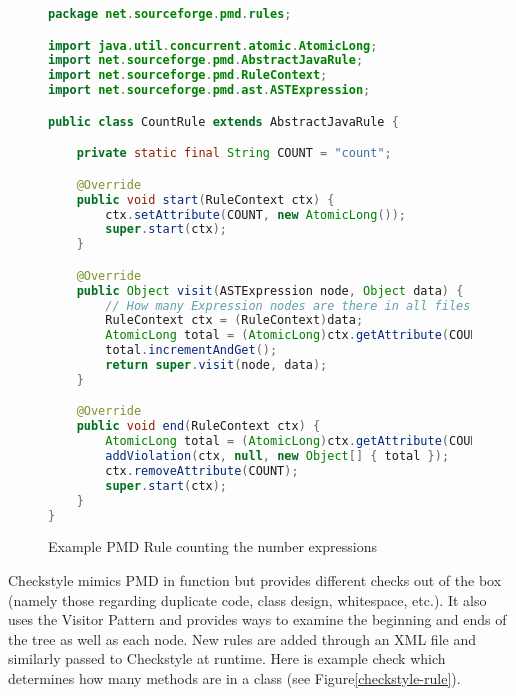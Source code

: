 \documentclass[12pt]{report}
\newcommand{\todoin}{\todo[inline]}
\def\lstlistingname{Figure}
\newcommand{\refCode}{\lstlistingname \hspace{1mm}}
\begin{document}
\begin{figure}
\caption[Example PMD Rule]{Example PMD Rule counting the number expressions}
\label{pmd-rule}
\begin{lstlisting}[language=Java]
package net.sourceforge.pmd.rules;

import java.util.concurrent.atomic.AtomicLong;
import net.sourceforge.pmd.AbstractJavaRule;
import net.sourceforge.pmd.RuleContext;
import net.sourceforge.pmd.ast.ASTExpression;

public class CountRule extends AbstractJavaRule {

	private static final String COUNT = "count";

	@Override
	public void start(RuleContext ctx) {
		ctx.setAttribute(COUNT, new AtomicLong());
		super.start(ctx);
	}

	@Override
	public Object visit(ASTExpression node, Object data) {
		// How many Expression nodes are there in all files parsed! 
		RuleContext ctx = (RuleContext)data;
		AtomicLong total = (AtomicLong)ctx.getAttribute(COUNT);
		total.incrementAndGet();
		return super.visit(node, data);
	}

	@Override
	public void end(RuleContext ctx) {
		AtomicLong total = (AtomicLong)ctx.getAttribute(COUNT);
		addViolation(ctx, null, new Object[] { total });
		ctx.removeAttribute(COUNT);
		super.start(ctx);
	}
}
\end{lstlisting}
\end{figure}

Checkstyle mimics PMD in function but provides different checks out of the box (namely those 
regarding duplicate code, class design, whitespace, etc.). It also uses the Visitor Pattern and 
provides ways to examine the beginning and ends of the tree as well as each node. New rules are 
added through an XML file and similarly passed to Checkstyle at runtime. Here is example check 
which determines how many methods are in a class (see \refCode \ref{checkstyle-rule}).
\todoin{pad this out into its own}
\nocite{framaC}
\end{document}
